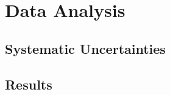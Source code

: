 \chapter{Data Analysis
\label{ch:analysis}}







\section{Systematic Uncertainties}

\section{Results}